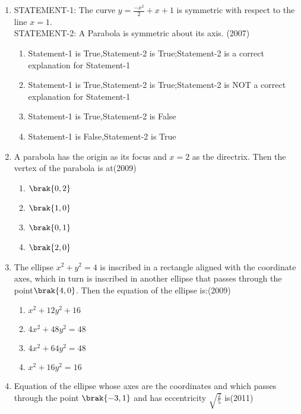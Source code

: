 \begin{enumerate}[label=\thesubsection.\arabic*.,ref=\thesubsection.\theenumi]
\item STATEMENT-1: The curve $y=\frac{-x^2}{2}+x+1$ is symmetric with respect to the line $x=1$.
	\\
STATEMENT-2: A Parabola is symmetric about its axis.
\hfill(2007)
			\begin{multicols}{2}
\begin{enumerate}
    \item Statement-1 is True,Statement-2 is True;Statement-2 is a correct explanation for Statement-1\item  Statement-1 is True,Statement-2 is True;Statement-2 is NOT a correct explanation for Statement-1\item Statement-1 is True,Statement-2 is False\item Statement-1 is False,Statement-2 is True
\end{enumerate}\end{multicols}
\item A parabola has the origin as its focus and $x=2$ as the directrix. Then the vertex of the parabola is at\hfill(2009)
	\begin{multicols}{4}
\begin{enumerate}
    \item $\brak{0,2}$
    \item $\brak{1,0}$
    \item $\brak{0,1}$
    \item $\brak{2,0}$
\end{enumerate}\end{multicols}
\item The ellipse $x^2+y^2 = 4$ is inscribed in a rectangle aligned with the coordinate axes, which in turn is inscribed in another ellipse that passes through the point$\brak{4,0}$. Then the equation of the ellipse is:\hfill(2009)
	\begin{multicols}{2}
\begin{enumerate}
    \item $x^2+12y^2+16$
    \item $4x^2+48y^2=48$
    \item $4x^2+64y^2=48$
    \item $x^2+16y^2=16$
\end{enumerate}\end{multicols}
\item Equation of the ellipse whose axes are the coordinates and which passes through the point $\brak{-3,1}$ and has eccentricity $\sqrt{\frac{2}{5}}$ is\hfill(2011)

\end{enumerate}
